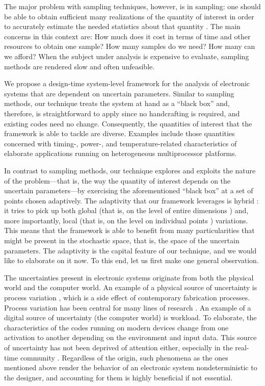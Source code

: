 The major problem with sampling techniques, however, is in sampling: one should
be able to obtain sufficient many realizations of the quantity of interest in
order to accurately estimate the needed statistics about that quantity
\cite{diaz-emparanza2002}. The main concerns in this context are: How much does
it cost in terms of time and other resources to obtain one sample? How many
samples do we need? How many can we afford? When the subject under analysis is
expensive to evaluate, sampling methods are rendered slow and often unfeasible.

We propose a design-time system-level framework for the analysis of electronic
systems that are dependent on uncertain parameters. Similar to sampling methods,
our technique treats the system at hand as a ``black box'' and, therefore, is
straightforward to apply since no handcrafting is required, and existing codes
need no change. Consequently, the quantities of interest that the framework is
able to tackle are diverse. Examples include those quantities concerned with
timing-, power-, and temperature-related characteristics of elaborate
applications running on heterogeneous multiprocessor platforms.

In contrast to sampling methods, our technique explores and exploits the nature
of the problem---that is, the way the quantity of interest depends on the
uncertain parameters---by exercising the aforementioned ``black box'' at a set
of points chosen adaptively. The adaptivity that our framework leverages is
hybrid \cite{jakeman2012}: it tries to pick up both global (that is, on the
level of entire dimensions \cite{klimke2006}) and, more importantly, local (that
is, on the level on individual points \cite{ma2009}) variations. This means that
the framework is able to benefit from many particularities that might be present
in the stochastic space, that is, the space of the uncertain parameters. The
adaptivity is the capital feature of our technique, and we would like to
elaborate on it now. To this end, let us first make one general observation.

The uncertainties present in electronic systems originate from both the physical
world and the computer world. An example of a physical source of uncertainty is
process variation \cite{srivastava2005}, which is a side effect of contemporary
fabrication processes. Process variation has been central for many lines of
research \cite{bhardwaj2008, juan2012, lee2013, ukhov2014, ukhov2015}. An
example of a digital source of uncertainty (the computer world) is workload. To
elaborate, the characteristics of the codes running on modern devices change
from one activation to another depending on the environment and input data. This
source of uncertainty has not been deprived of attention either, especially in
the real-time community \cite{quinton2012, diaz2002, santinelli2011,
tanasa2015}. Regardless of the origin, such phenomena as the ones mentioned
above render the behavior of an electronic system nondeterministic to the
designer, and accounting for them is highly beneficial if not essential.

